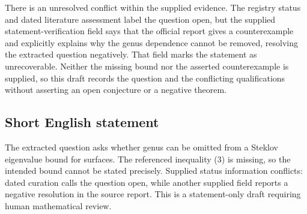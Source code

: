 \documentclass[11pt]{article}
\begin{document}
There is an unresolved conflict within the supplied evidence. The registry status and dated literature assessment label the question open, but the supplied statement-verification field says that the official report gives a counterexample and explicitly explains why the genus dependence cannot be removed, resolving the extracted question negatively. That field marks the statement as unrecoverable. Neither the missing bound nor the asserted counterexample is supplied, so this draft records the question and the conflicting qualifications without asserting an open conjecture or a negative theorem.
\subsection{Short English statement}
The extracted question asks whether genus can be omitted from a Steklov eigenvalue bound for surfaces. The referenced inequality (3) is missing, so the intended bound cannot be stated precisely. Supplied status information conflicts: dated curation calls the question open, while another supplied field reports a negative resolution in the source report. This is a statement-only draft requiring human mathematical review.
\end{document}
